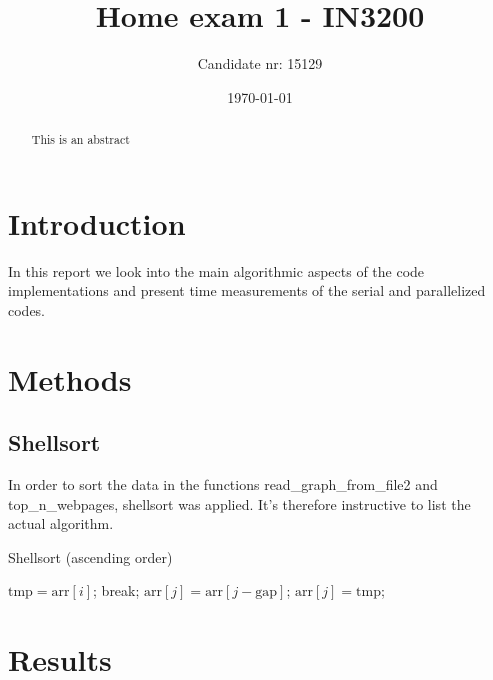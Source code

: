 \documentclass[english,notitlepage,reprint]{revtex4-1}  %
\begin{document}
\title{Home exam 1 - IN3200}      %
\author{Candidate nr: 15129}          %
\date{\today}                             %
\noaffiliation                            %
                               
\begin{abstract}
This is an abstract

\end{abstract}
\maketitle 
\section{Introduction}
In this report we look into the main algorithmic aspects of the code implementations and present time measurements of the serial and parallelized codes.
\section{Methods}
\subsection*{Shellsort}
In order to sort the data in the functions read\_graph\_from\_file2 and 
top\_n\_webpages, shellsort was applied. It's therefore instructive to list the actual algorithm. 
\begin{algorithm}[h!]
	\caption{Shellsort (ascending order)}
	\label{algo:metro}
	\begin{algorithmic}
		\State $\text{tmp} = \text{arr}[i]$;
		\State break;
		\EndIf
		\State $\text{arr}[j] = \text{arr}[j-\text{gap}]$;
		\EndFor
		\State $\text{arr}[j] = \text{tmp}$;
	\end{algorithmic}
\end{algorithm}
\section{Results}
\end{document}
